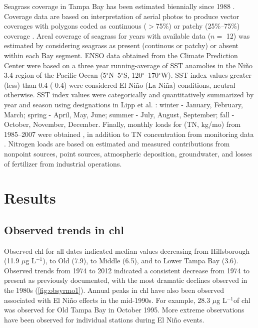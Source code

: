 \documentclass{svjour3}\usepackage[]{graphicx}\usepackage[]{color}
\newcommand{\mugl}{$\mu$g L$^{-1}$}
\begin{document}
Seagrass coverage in Tampa Bay has been estimated biennially since 1988 \cite{Tomasko05}.  Coverage data are based on interpretation of aerial photos to produce vector coverages with polygons coded as continuous ($>$75\%) or patchy (25\%--75\%) coverage \cite{SFWMD13}.  Areal coverage of seagrass for years with available data ($n=$ 12) was estimated by considering seagrass as present (continous or patchy) or absent within each Bay segment.  \ac{ENSO} data obtained from the Climate Prediction Center \cite{CPC13} were based on a three year running-average of \ac{SST} anamolies in the Ni\~{n}o 3.4 region of the Pacific Ocean (5$^{\circ}$N--5$^{\circ}$S, 120$^{\circ}$--170$^{\circ}$W).  \ac{SST} index values greater (less) than 0.4 (-0.4) were considered El Ni\~{n}o (La Ni\~{n}a) conditions, neutral otherwise.  \ac{SST} index values were categorically and quantitatively summarized by year and season using designations in Lipp et al. \cite{Lipp01}: winter - January, February, March; spring - April, May, June; summer - July, August, September; fall - October, November, December.  Finally, monthly loads for  (\acs{TN}, kg/mo) from 1985--2007 were obtained \cite{Zarbock94,Pribble01,Poe05}, in addition to \ac{TN} concentration from monitoring data \cite{TBEP11}.  Nitrogen loads are based on estimated and measured contributions from nonpoint sources, point sources, atmospheric deposition, groundwater, and losses of fertilizer from industrial operations.

\section{Results}

\subsection{Observed trends in \acl{chl}}

Observed \ac{chl} for all dates indicated median values decreasing from Hillsborough (11.9 \mugl), to Old (7.9), to Middle (6.5), and to Lower Tampa Bay (3.6).  Observed trends from 1974 to 2012 indicated a consistent decrease from 1974 to present as previously documented, with the most dramatic declines observed in the 1980s (\cref{fig:obsyrmo1}).  Annual peaks in \ac{chl} have also been observed associated with El Ni\~{n}o effects \cite{Greening06} in the mid-1990s.  For example, 28.3 \mugl of \ac{chl} was observed for Old Tampa Bay in October 1995.  More extreme observations have been observed for individual stations during El Ni\~{n}o events. 
\end{document}
